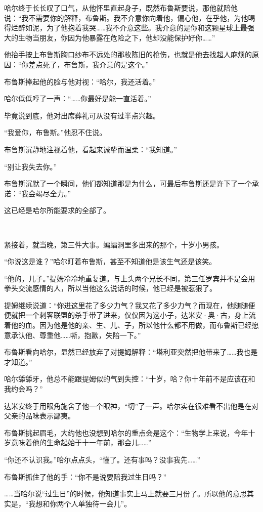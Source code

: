 \documentclass[../main]{subfiles}
\begin{document}
哈尔终于长长叹了口气，从他怀里直起身子，既然布鲁斯要说，那他就陪他说：“我不需要你的解释，布鲁斯。我不介意你向着他，偏心他，在乎他，为他喝得烂醉如泥，为了他抱着我哭……我不介意这些。我介意的是你和这颗星球上最强大的生物当朋友，你因为他暴露在危险之下，他却没能保护好你……”

他抬手按上布鲁斯胸口纱布不远处的那枚陈旧的枪伤，也就是他去找超人麻烦的原因：“你差点死了，布鲁斯，我介意的是这个。”

布鲁斯捧起他的脸与他对视：“哈尔，我还活着。”

哈尔低低哼了一声：“……你最好是能一直活着。”

毕竟说到底，他对出席葬礼可从没有过半点兴趣。

“我爱你，布鲁斯。”他忍不住说。

布鲁斯沉静地注视着他，看起来诚挚而温柔：“我知道。”

“别让我失去你。”

布鲁斯沉默了一个瞬间，他们都知道那是为什么，可最后布鲁斯还是许下了一个承诺：“我会竭尽全力。”

这已经是哈尔所能要求的全部了。

~\

紧接着，就当晚，第三件大事。蝙蝠洞里多出来的那个，十岁小男孩。

“你说这是谁？”哈尔盯着布鲁斯，甚至不知道他是该生气还是该笑。

“他的，儿子。”提姆冷冷地重复道。与上头两个兄长不同，第三任罗宾并不是会用拳头交流感情的人，所以当他这么说话的时候，他已经是被惹狠了。

提姆继续说道：“你进这里花了多少力气？我又花了多少力气？而现在，他随随便便就把一个刺客联盟的杀手带了进来，仅仅因为这小子，达米安·奥·古，身上流着他的血。因为他是他的亲、生、儿、子，所以他什么都不用做，而布鲁斯已经愿意承认他、尊重他……嘶，抱歉，失陪一下。”

布鲁斯看向哈尔，显然已经放弃了对提姆解释：“塔利亚突然把他带来了……我也是才知道。”

哈尔舔舔牙，他总不能跟提姆似的气到失控：“十岁，哈？你十年前不是应该在和我约会吗？”

达米安终于用眼角施舍了他一个眼神，“切”了一声。哈尔实在很难看不出他是在对父亲的品味表示鄙夷。

布鲁斯挑起眉毛，大约他也没想到哈尔的重点会是这个：“生物学上来说，今年十岁意味着他的生命起始于十一年前，那会儿……”

“你还不认识我。”哈尔点点头，“懂了。还有事吗？没事我先……”

布鲁斯抓住了他的手：“你不是说要陪我过生日吗？”

……当哈尔说“过生日”的时候，他知道事实上马上就要三月份了。所以他的意思其实是，“我想和你两个人单独待一会儿”。
\end{document}
